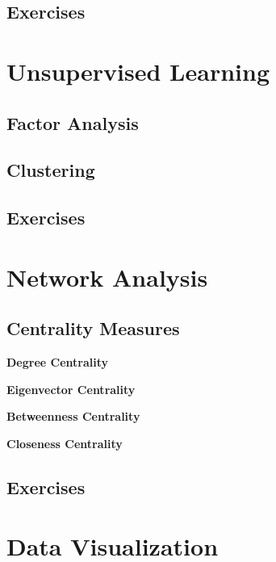 \documentclass[]{book}
\begin{document}
\hypertarget{exercises-9}{%
\section{Exercises}\label{exercises-9}}

\hypertarget{unsup-lrn}{%
\chapter{Unsupervised Learning}\label{unsup-lrn}}

\hypertarget{factor-analysis}{%
\section{Factor Analysis}\label{factor-analysis}}

\hypertarget{clustering}{%
\section{Clustering}\label{clustering}}

\hypertarget{exercises-10}{%
\section{Exercises}\label{exercises-10}}

\hypertarget{net-anal}{%
\chapter{Network Analysis}\label{net-anal}}

\hypertarget{centrality-measures}{%
\section{Centrality Measures}\label{centrality-measures}}

\textbf{Degree Centrality}

\textbf{Eigenvector Centrality}

\textbf{Betweenness Centrality}

\textbf{Closeness Centrality}

\hypertarget{exercises-11}{%
\section{Exercises}\label{exercises-11}}

\hypertarget{data-viz}{%
\chapter{Data Visualization}\label{data-viz}}
\end{document}
